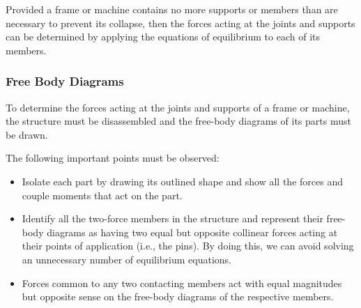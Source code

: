 \documentclass{article}
\begin{document}
Provided a frame or machine contains no more
supports or members than are necessary to prevent its collapse, then the
forces acting at the joints and supports can be determined by applying the
equations of equilibrium to each of its members.
\subsubsection{Free Body Diagrams}
To determine the forces acting at
the joints and supports of a frame or machine, the structure must be
disassembled and the free-body diagrams of its parts must be drawn.

The following important points must be observed:
\begin{itemize}
    \item Isolate each part by drawing its outlined shape and show all the
          forces and couple moments that act on the part.
    \item Identify all the two-force members in the structure and represent
          their free-body diagrams as having two equal but opposite collinear
          forces acting at their points of application (i.e., the pins). By doing
          this, we can avoid solving an unnecessary number of equilibrium
          equations.
    \item Forces common to any two contacting members act with equal
          magnitudes but opposite sense on the free-body diagrams of the
          respective members.
\end{itemize}
\end{document}
